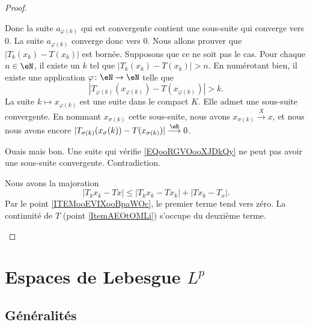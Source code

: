 \begin{proof}
\begin{subproof}
\begin{subproof}
			Donc la suite \( a_{\varphi(k)}\) qui est convergente contient une sous-suite qui converge vers \( 0\). La suite \( a_{\varphi(k)}\) converge donc vers \( 0\).
			Nous allons prouver que \( | T_k(x_k)-T(x_k) |\) est bornée. Supposons que ce ne soit pas le cas. Pour chaque \( n\in \eN\), il existe un \( k\) tel que \( | T_k(x_k)-T(x_k) |>n\). En numérotant bien, il existe une application \( \varphi\colon \eN\to \eN\) telle que
			\begin{equation}        \label{EQooRGVOooXJDkQy}
				| T_{\varphi(k)}(x_{\varphi(k)})-T(x_{\varphi(k)}) |>k.
			\end{equation}
			La suite \( k\mapsto x_{\varphi(k)}\) est une suite dans le compact \( K\). Elle admet une sous-suite convergente. En nommant \( x_{\sigma(k)}\) cette sous-suite, nous avons \( x_{\sigma(k)}\stackrel{X}{\longrightarrow}x\), et nous nous avons encore \( | T_{\sigma(k)}(x_{\sigma}(k))-T(x_{\sigma(k)}) |\stackrel{\eR}{\longrightarrow}0\).

			Ouais mais bon. Une suite qui vérifie \eqref{EQooRGVOooXJDkQy} ne peut pas avoir une sous-suite convergente. Contradiction.
		\end{subproof}
		Nous avons la majoration
		\begin{equation}
			| T_kx_k-Tx |\leq | T_kx_k-Tx_k |+| Tx_k-T_x |.
		\end{equation}
		Par le point \ref{ITEMooEVIXooBpaWOc}, le premier terme tend vers zéro. La continuité de \( T\) (point \ref{ItemAEOtOMLi}) s'occupe du deuxième terme.
	\end{subproof}
\end{proof}




\section{Espaces de Lebesgue \texorpdfstring{\( L^p\)}{Lp}}
\label{SecVKiVIQK}

\subsection{Généralités}

